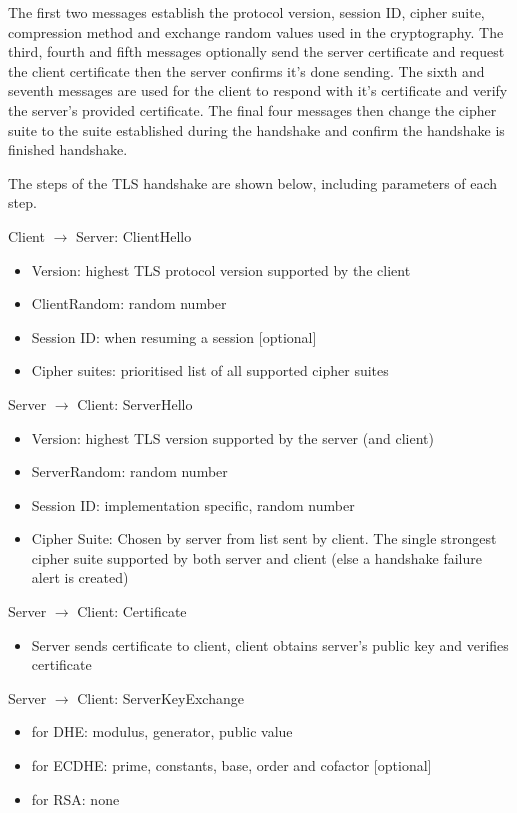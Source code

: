 The first two messages establish the protocol version, session ID, cipher suite, compression method and exchange random values used in the cryptography. The third, fourth and fifth messages optionally send the server certificate and request the client certificate then the server confirms it's done sending. The sixth and seventh messages are used for the client to respond with it's certificate and verify the server's provided certificate. The final four messages then change the cipher suite to the suite established during the handshake and confirm the handshake is finished handshake.

The steps of the TLS handshake are shown below, including parameters of each step.

Client $\rightarrow$ Server: ClientHello
\begin{itemize}
    \item Version: highest TLS protocol version supported by the client
    \item ClientRandom: random number
    \item Session ID: when resuming a session [optional]
    \item Cipher suites: prioritised list of all supported cipher suites
\end{itemize}

Server $\rightarrow$ Client: ServerHello
\begin{itemize}
    \item Version: highest TLS version supported by the server (and client)
    \item ServerRandom: random number
    \item Session ID: implementation specific, random number
    \item Cipher Suite: Chosen by server from list sent by client. The single strongest cipher suite supported by both server and client (else a handshake failure alert is created)
\end{itemize}

Server $\rightarrow$ Client: Certificate
\begin{itemize}
    \item Server sends certificate to client, client obtains server's public key and verifies certificate
\end{itemize}

Server $\rightarrow$ Client: ServerKeyExchange
\begin{itemize}
    \item for DHE: modulus, generator, public value
    \item for ECDHE: prime, constants, base, order and cofactor [optional]
    \item for RSA: none
\end{itemize}

